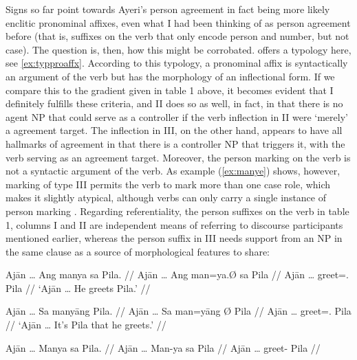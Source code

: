 Signs so far point towards Ayeri's person agreement in fact being more 
likely enclitic pronominal affixes, even what I had been thinking of as 
person agreement before (that is, suffixes on the verb that only encode person 
and number, but not case). The question is, then, how this might be corrobated. 
\citeauthor{corbett2006} offers a typology here, see \autoref{ex:typproaffx}. 
According to this typology, a pronominal affix is syntactically an argument of 
the verb but has the morphology of an inflectional form. If we compare this to 
the gradient given in table 1 above, it becomes evident that I definitely 
fulfills these criteria, and II does so as well, in fact, in that there is no 
agent NP that could serve as a controller if the verb inflection in II were 
`merely' a agreement target. The inflection in III, on the other hand, appears 
to have all hallmarks of agreement in that there is a controller NP that 
triggers it, with the verb serving as an agreement target. Moreover, the person 
marking on the verb is not a syntactic argument of the verb. As example 
(\ref{ex:manye}) shows, however, marking of type III permits the verb to mark 
more than one case role, which makes it slightly atypical, although verbs can 
only carry a single instance of person marking \citep[103]{corbett2006}. 
Regarding referentiality, the person suffixes on the verb in table 1, columns I 
and II are independent means of referring to discourse participants mentioned 
earlier, whereas the person suffix in III needs support from an NP in the same 
clause as a source of morphological features to share:

\pex %
\a\label{ex:agttopclit}\begingl
	\gla Ajān … Ang manya sa Pila. //
	\glb Ajān … Ang man=ya.Ø sa ​Pila //
	\glc Ajān … \AgtT{} greet=\TsgM{}.\Top{} \Parg{} ​Pila //
	\glft `Ajān … He greets Pila.' //
\endgl

\a\label{ex:agtproclit}\begingl
	\gla Ajān … Sa manyāng {} Pila. //
	\glb Ajān … Sa man=yāng Ø ​Pila //
	\glc Ajān … \PatT{} greet=\TsgM{}.\Aarg{} \Top{} ​Pila //
	\glft `Ajān … It's Pila that he greets.' //
\endgl

\a\label{ex:wrongagr}\ljudge* \begingl
	\gla Ajān … Manya sa Pila. //
	\glb Ajān … Man-ya sa ​Pila //
	\glc Ajān … greet-\TsgM{} \Parg{} ​Pila //
\endgl

\xe

